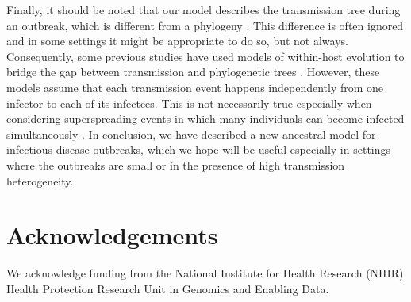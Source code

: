 \documentclass{article}
\begin{document}
Finally, it should be noted that our model describes the transmission tree during
an outbreak, which is different from a phylogeny \citep{Jombart2011}. 
This difference is often ignored and in some settings it might be appropriate to do so,
but not always. Consequently, some
previous studies have used models of within-host evolution to bridge
the gap between transmission and phylogenetic trees
\citep{Didelot2014,Hall2015,Didelot2017}. However, these models assume
that each transmission event happens independently from one infector
to each of its infectees. This is not necessarily true especially when considering
superspreading events in which many individuals can become infected
simultaneously \citep{Riley2003,Wallinga2004,hoAccountingPotentialOverdispersion2023}.
In conclusion, we have described a new ancestral model for infectious disease
outbreaks, which we hope will be useful especially in settings where 
the outbreaks are small or in the presence of high transmission heterogeneity.

\section*{Acknowledgements}

We acknowledge funding from the National Institute for Health Research (NIHR) Health Protection Research Unit in Genomics and Enabling Data.

\clearpage

%

\end{document}
